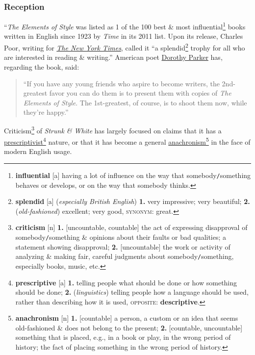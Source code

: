 \documentclass{article}
\begin{document}
\subsubsection{Reception}
``{\it The Elements of Style} was listed as 1 of the 100 best \& most influential\footnote{{\bf influential} [a] having a lot of influence on the way that somebody{\tt/}something behaves or develops, or on the way that somebody thinks.} books written in English since 1923 by {\it Time} in its 2011 list. Upon its release, Charles Poor, writing for \href{https://en.wikipedia.org/wiki/The_New_York_Times}{{\it The New York Times}}, called it ``a splendid\footnote{{\bf splendid} [a] ({\it especially British English}) {\bf 1.} very impressive; very beautiful; {\bf 2.} ({\it old-fashioned}) excellent; very good, \textsc{synonym}: great.} trophy for all who are interested in reading \& writing.'' American poet \href{https://en.wikipedia.org/wiki/Dorothy_Parker}{Dorothy Parker} has, regarding the book, said:
\begin{quotation}
	``If you have any young friends who aspire to become writers, the 2nd-greatest favor you can do them is to present them with copies of {\it The Elements of Style}. The 1st-greatest, of course, is to shoot them now, while they're happy.''
\end{quotation}
Criticism\footnote{{\bf criticism} [n] {\bf 1.} [uncountable, countable] the act of expressing disapproval of somebody{\tt/}something \& opinions about their faults or bad qualities; a statement showing disapproval; {\bf 2.} [uncountable] the work or activity of analyzing \& making fair, careful judgments about somebody{\tt/}something, especially books, music, etc.} of {\it Strunk \& White} has largely focused on claims that it has a \href{https://en.wikipedia.org/wiki/Linguistic_prescriptivism}{prescriptivist}\footnote{{\bf prescriptive} [a] {\bf 1.} telling people what should be done or how something should be done; {\bf 2.} ({\it linguistics}) telling people how a language should be used, rather than describing how it is used, \textsc{opposite}: {\bf descriptive}.} nature, or that it has become a general \href{https://en.wikipedia.org/wiki/Anachronism}{anachronism}\footnote{{\bf anachronism} [n] {\bf 1.} [countable] a person, a custom or an idea that seems old-fashioned \& does not belong to the present; {\bf 2.} [countable, uncountable] something that is placed, e.g., in a book or play, in the wrong period of history; the fact of placing something in the wrong period of history.} in the face of modern English usage.
\end{document}
